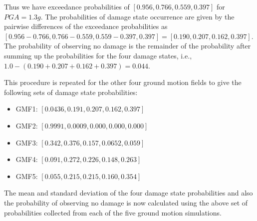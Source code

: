 Thus we have exceedance probabilities of $[0.956, 0.766, 0.559, 0.397]$ for $PGA = 1.3 g$. The probabilities of damage state occurrence are given by the pairwise differences of the exceedance probabilities as $[0.956 - 0.766, 0.766 - 0.559, 0.559 - 0.397, 0.397] = [0.190, 0.207, 0.162, 0.397]$. The probability of observing no damage is the remainder of the probability after summing up the probabilities for the four damage states, i.e., $1.0 - (0.190 + 0.207 + 0.162 + 0.397) = 0.044$.

This procedure is repeated for the other four ground motion fields to give the following sets of damage state probabilities:

\begin{itemize}
	\item GMF1: $[0.0436, 0.191, 0.207, 0.162, 0.397]$
	\item GMF2: $[0.9991, 0.0009, 0.000, 0.000, 0.000]$
	\item GMF3: $[0.342, 0.376, 0.157, 0.0652, 0.059]$
	\item GMF4: $[0.091, 0.272, 0.226, 0.148, 0.263]$
	\item GMF5: $[0.055, 0.215, 0.215, 0.160, 0.354]$
\end{itemize}

The mean and standard deviation of the four damage state probabilities and also the probability of observing no damage is now calculated using the above set of probabilities collected from each of the five ground motion simulations.